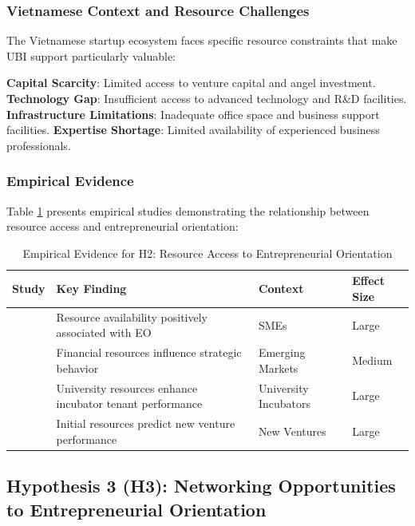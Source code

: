 \documentclass[../Main.tex]{subfiles}
\begin{document}
    \subsubsection{Vietnamese Context and Resource Challenges}
    The Vietnamese startup ecosystem faces specific resource constraints that make UBI support particularly valuable:

    \textbf{Capital Scarcity}: Limited access to venture capital and angel investment. 
    \textbf{Technology Gap}: Insufficient access to advanced technology and R\&D facilities. 
    \textbf{Infrastructure Limitations}: Inadequate office space and business support facilities. 
    \textbf{Expertise Shortage}: Limited availability of experienced business professionals.

    \subsubsection{Empirical Evidence}
    Table \ref{tab:h2_evidence} presents empirical studies demonstrating the relationship between resource access and entrepreneurial orientation:

    \begin{table}[H]
        \centering
        \caption{Empirical Evidence for H2: Resource Access to Entrepreneurial Orientation}
        \label{tab:h2_evidence}
        \begin{tabular}{|p{3cm}|p{4cm}|p{3cm}|p{2cm}|}
            \hline
            \textbf{Study} & \textbf{Key Finding} & \textbf{Context} & \textbf{Effect Size} \\
            \hline
            \autocite{wiklund2005entrepreneurial} & Resource availability positively associated with EO & SMEs & Large \\
            \hline
            \autocite{bruton2010governance} & Financial resources influence strategic behavior & Emerging Markets & Medium \\
            \hline
            \autocite{mian1996assessing} & University resources enhance incubator tenant performance & University Incubators & Large \\
            \hline
            \autocite{cooper1994initial} & Initial resources predict new venture performance & New Ventures & Large \\
            \hline
        \end{tabular}
    \end{table}

    \subsection{Hypothesis 3 (H3): Networking Opportunities to Entrepreneurial Orientation}
\end{document}

